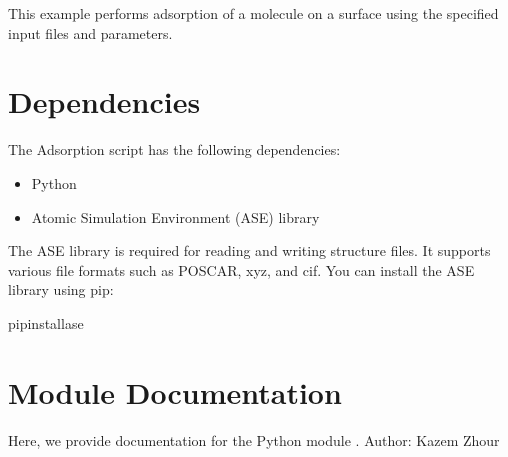 \documentclass[letterpaper,10pt,english]{sphinxmanual}
\begin{document}
\sphinxAtStartPar
This example performs adsorption of a molecule on a surface using the specified input files and parameters.

\sphinxstepscope


\section{Dependencies}
\label{\detokenize{dependencies:dependencies}}\label{\detokenize{dependencies::doc}}
\sphinxAtStartPar
The Adsorption script has the following dependencies:
\begin{itemize}
\item {} 
\sphinxAtStartPar
Python

\item {} 
\sphinxAtStartPar
Atomic Simulation Environment (ASE) library

\end{itemize}

\sphinxAtStartPar
The ASE library is required for reading and writing structure files. It supports various file formats such as POSCAR, xyz, and cif. You can install the ASE library using pip:

\begin{sphinxVerbatim}[commandchars=\\\{\}]
pipinstallase
\end{sphinxVerbatim}

\sphinxstepscope


\section{Module Documentation}
\label{\detokenize{module_documentation:module-documentation}}\label{\detokenize{module_documentation::doc}}
\sphinxAtStartPar
Here, we provide documentation for the Python module .
\label{\detokenize{module_documentation:module-Adsorption}}
\sphinxAtStartPar
Author: Kazem Zhour
\end{document}
